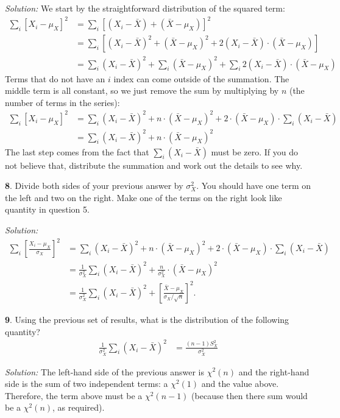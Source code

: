 \documentclass{tufte-handout}
\begin{document}
\textit{Solution:} We start by the straightforward
distribution of the squared term:
\begin{align*}
\sum_i \left[ X_i - \mu_X \right]^2 &= \sum_i \left[ (X_i - \bar{X}) + (\bar{X} - \mu_X) \right]^2 \\
&= \sum_i \left[ (X_i - \bar{X})^2 + (\bar{X} - \mu_X)^2 + 2 (X_i - \bar{X}) \cdot (\bar{X} - \mu_X) \right] \\
&= \sum_i (X_i - \bar{X})^2 + \sum_i (\bar{X} - \mu_X)^2 + \sum_i 2 (X_i - \bar{X}) \cdot (\bar{X} - \mu_X)
\end{align*}
Terms that do not have an $i$ index can come outside of the summation. The middle
term is all constant, so we just remove the sum by multiplying by $n$ (the number
of terms in the series):
\begin{align*}
\sum_i \left[ X_i - \mu_X \right]^2 
&= \sum_i (X_i - \bar{X})^2 + n \cdot (\bar{X} - \mu_X)^2 + 2 \cdot (\bar{X} - \mu_X) \cdot \sum_i  (X_i - \bar{X}) \\
&= \sum_i (X_i - \bar{X})^2 + n \cdot (\bar{X} - \mu_X)^2
\end{align*}
The last step comes from the fact that $\sum_i (X_i - \bar{X})$ must be zero. If
you do not believe that, distribute the summation and work out the details to see
why. 

\textbf{8}. Divide both sides of your previous answer by $\sigma_X^2$. You
should have one term on the left and two on the right. Make one of the terms
on the right look like quantity in question 5.

\textit{Solution:} \begin{align*}
\sum_i \left[ \frac{X_i - \mu_X}{\sigma_X} \right]^2 
&= \sum_i (X_i - \bar{X})^2 + n \cdot (\bar{X} - \mu_X)^2 + 2 \cdot (\bar{X} - \mu_X) \cdot \sum_i  (X_i - \bar{X}) \\
&= \frac{1}{\sigma_X^2} \sum_i (X_i - \bar{X})^2 + \frac{n}{\sigma_X^2} \cdot (\bar{X} - \mu_X)^2 \\
&= \frac{1}{\sigma_X^2} \sum_i (X_i - \bar{X})^2 + \left[\frac{\bar{X} - \mu_X}{\sigma_X / \sqrt{n}} \right]^2.
\end{align*}

\textbf{9}. Using the previous set of results, what is the distribution of
the following quantity?
\begin{align*}
\frac{1}{\sigma_X^2} \sum_i (X_i - \bar{X})^2 &= \frac{(n-1) S_X^2}{\sigma_X^2}
\end{align*}

\textit{Solution:} The left-hand side of the previous answer is $\chi^2(n)$ and the right-hand
side is the sum of two independent terms: a $\chi^2(1)$ and the value above. Therefore,
the term above must be a $\chi^2(n-1)$ (because then there sum would be a $\chi^2(n)$,
as required). 
\end{document}
